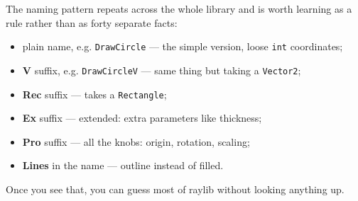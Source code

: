 The naming pattern repeats across the whole library and is worth learning as a
rule rather than as forty separate facts:

\begin{itemize}[leftmargin=*,itemsep=2pt]
  \item plain name, e.g. \lstinline|DrawCircle| --- the simple version, loose
        \lstinline|int| coordinates;
  \item \textbf{V} suffix, e.g. \lstinline|DrawCircleV| --- same thing but taking
        a \lstinline|Vector2|;
  \item \textbf{Rec} suffix --- takes a \lstinline|Rectangle|;
  \item \textbf{Ex} suffix --- extended: extra parameters like thickness;
  \item \textbf{Pro} suffix --- all the knobs: origin, rotation, scaling;
  \item \textbf{Lines} in the name --- outline instead of filled.
\end{itemize}

Once you see that, you can guess most of raylib without looking anything up.


